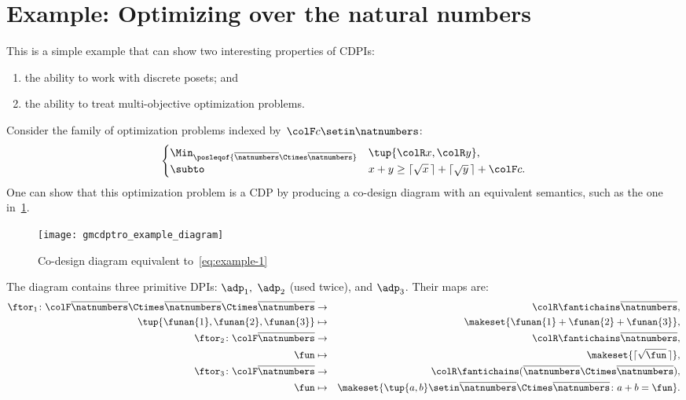 \section{Example: Optimizing over the natural numbers}

This is a simple example that can show two interesting properties of CDPIs:
\begin{enumerate}
    \item the ability to work with discrete posets; and
    \item the ability to treat multi-objective optimization problems.
\end{enumerate}
Consider the family of optimization problems indexed by~${\colF c}\setin\natnumbers$:
%
\begin{equation}
    \begin{cases}
        \Min_{\posleqof{\overline{\natnumbers}\Ctimes\overline{\natnumbers}}} & \tup{ {\colR x},{\colR y}} ,                                    \\
        \subto                                                                & x+y\geq\lceil\sqrt{x}\,\rceil+\lceil\sqrt{y}\,\rceil+{\colF c}.
    \end{cases}\label{eq:example-1}
\end{equation}
%
One can show that this optimization problem is a CDP by producing a co-design diagram with an equivalent semantics, such as the one in~\cref{fig:toydiagram}.

\begin{figure}[h]
    \centering
    \texttt{[image: gmcdptro\_example\_diagram]}
    \caption{Co-design diagram equivalent to~\cref{eq:example-1}}
    \label{fig:toydiagram}
\end{figure}

The diagram contains three primitive DPIs: $\adp_{1},$ $\adp_{2}$ (used twice), and $\adp_{3}$.
Their \ftor maps are:
\begin{eqnarray*}
    \ftor_{1}\colon {\colF\overline{\natnumbers}\Ctimes\overline{\natnumbers}\Ctimes\overline{\natnumbers}} & \to & {\colR\fantichains\overline{\natnumbers}},\\
    \tup{ \funan{1},\funan{2},\funan{3}}  & \mapsto & \makeset{\funan{1}+\funan{2}+\funan{3}},\\
    \ftor_{2}\colon {\colF\overline{\natnumbers}} & \rightarrow & {\colR\fantichains\overline{\natnumbers}},\\
    \fun& \mapsto & \makeset{\lceil\sqrt{\fun}\,\rceil},\\
    \ftor_{3}\colon{\colF\overline{\natnumbers}} & \rightarrow & {\colR\fantichains(\overline{\natnumbers}\Ctimes\overline{\natnumbers})},\\
    \fun& \mapsto & \makeset{\tup{ a,b} \setin\overline{\natnumbers}\Ctimes\overline{\natnumbers}\colon a+b=\fun}.
\end{eqnarray*}


